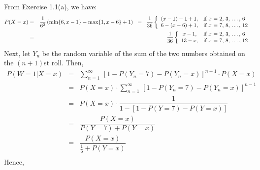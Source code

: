 From Exercise 1.1(a), we have:
\begin{eqnarray*}
P(X = x)
& = &
\dfrac{1}{6^{2}}\left( \min\{6,x-1\} - \max\{1,x-6\} + 1 \right)
\;\; = \;\;
\dfrac{1}{36}\left\{\begin{array}{cl}
(x-1) - 1 + 1  , & \textnormal{if $x$ = 2, 3, \ldots,  6} \\
6 - (x - 6) + 1, & \textnormal{if $x$ = 7, 8, \ldots, 12} \\
\end{array}\right.
\\
& = &
\dfrac{1}{36}\left\{\begin{array}{cl}
 x - 1, & \textnormal{if $x$ = 2, 3, \ldots,  6} \\
13 - x, & \textnormal{if $x$ = 7, 8, \ldots, 12} \\
\end{array}\right.
\end{eqnarray*}
Next, let $Y_{n}$ be the random variable of the sum of the two numbers obtained on the
$(n+1)$st roll.  Then,
\begin{eqnarray*}
P(W = 1 \vert X = x)
& = &
\sum_{n=1}^{\infty}\,\left[1 - P(Y_{n} = 7) - P(Y_{n} = x)\right]^{n-1} \cdot P(X = x) \\
& = &
P(X = x) \cdot \sum_{n=1}^{\infty}\,\left[1 - P(Y_{n} = 7) - P(Y_{n} = x)\right]^{n-1} \\
& = &
P(X = x) \cdot \dfrac{1}{1 - \left[1 - P(Y = 7) - P(Y = x)\right]} \\
& = &
\dfrac{P(X = x)}{P(Y = 7) + P(Y = x)} \\
& = &
\dfrac{P(X = x)}{\frac{1}{6} + P(Y = x)} \\
\end{eqnarray*}
Hence,
